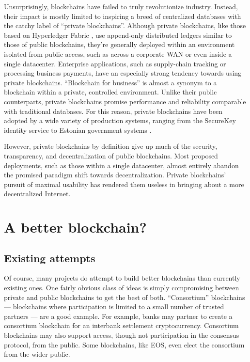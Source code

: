 \documentclass[headinclude]{scrbook}
\begin{document}
Unsurprisingly, blockchains have failed to truly revolutionize industry. Instead, their  impact is mostly limited to inspiring a breed of centralized databases with the catchy label of ``private blockchains''. Although private blockchains, like those based on Hyperledger Fabric \cite{cachin2016architecture}, use append-only distributed ledgers similar to those of public blockchains, they're generally deployed within an environment isolated from public access, such as across a corporate WAN or even inside a single datacenter. Enterprise applications, such as supply-chain tracking or processing business payments, have an especially strong tendency towards using private blockchains. ``Blockchain for business'' is almost a synonym to a blockchain within a private, controlled environment. Unlike their public counterparts, private blockchains promise performance and reliability comparable with traditional databases. For this reason, private blockchains have been adopted by a wide variety of production systems, ranging from the SecureKey identity service \cite{securekey} to Estonian government systems \cite{estonia}.

However, private blockchains by definition give up much of the security, transparency, and decentralization of public blockchains. Most proposed deployments, such as those within a single datacenter, almost entirely abandon the promised paradigm shift towards decentralization. Private blockchains' pursuit of maximal usability has rendered them useless in bringing about a more decentralized Internet.

\section{A better blockchain?}

\subsection{Existing attempts}

Of course, many projects do attempt to build better blockchains than currently existing ones. One fairly obvious class of ideas is simply compromising between private and public blockchains to get the best of both. ``Consortium'' blockchains --- blockchains where participation is limited to a small number of trusted partners --- are a good example. For example, banks may partner to create a consortium blockchain for an interbank settlement cryptocurrency. Consortium blockchains may also support access, though not participation in the consensus protocol, from the public. Some blockchains, like EOS, even elect the consortium from the wider public.
\end{document}
